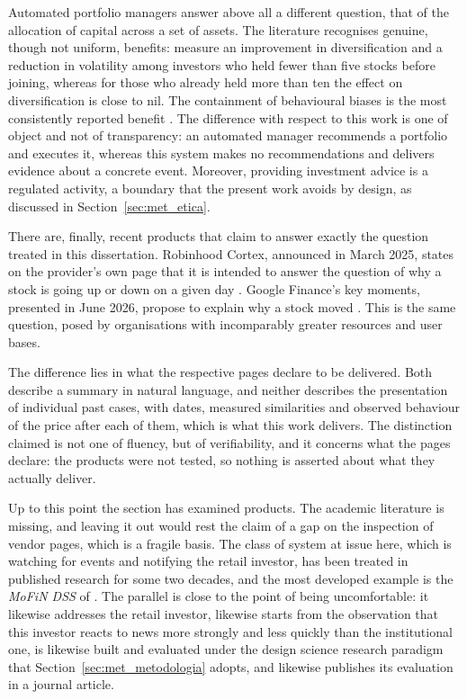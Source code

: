 Automated portfolio managers answer above all a different question, that of the allocation of
capital across a set of assets. The literature recognises genuine, though not uniform, benefits:
\textcite{dacunto2019robo} measure an improvement in diversification and a reduction in volatility
among investors who held fewer than five stocks before joining, whereas for those who already held
more than ten the effect on diversification is close to nil. The containment of behavioural biases
is the most consistently reported benefit \autocite{dacunto2019robo, cardillo2024robo}. The
difference with respect to this work is one of object and not of transparency: an automated manager
recommends a portfolio and executes it, whereas this system makes no recommendations and delivers
evidence about a concrete event. Moreover, providing investment advice is a regulated activity, a
boundary that the present work avoids by design, as discussed in Section~\ref{sec:met_etica}.

There are, finally, recent products that claim to answer exactly the question treated in this
dissertation. Robinhood Cortex, announced in March 2025, states on the provider's own page that it
is intended to answer the question of why a stock is going up or down on a given day
\autocite{robinhood2025cortex}. Google Finance's key moments, presented in June 2026, propose to
explain why a stock moved \autocite{google2026finance}. This is the same question, posed by
organisations with incomparably greater resources and user bases.

The difference lies in what the respective pages declare to be delivered. Both describe a summary
in natural language, and neither describes the presentation of individual past cases, with dates,
measured similarities and observed behaviour of the price after each of them, which is what this
work delivers. The distinction claimed is not one of fluency, but of verifiability, and it concerns
what the pages declare: the products were not tested, so nothing is asserted about what they
actually deliver.

Up to this point the section has examined products. The academic literature is missing, and leaving
it out would rest the claim of a gap on the inspection of vendor pages, which is a fragile basis.
The class of system at issue here, which is watching for events and notifying the retail investor, has
been treated in published research for some two decades, and the most developed example is the
\emph{MoFiN DSS} of \textcite{muntermann2009ubiquitous}. The parallel is close to the point of
being uncomfortable: it likewise addresses the retail investor, likewise starts from the
observation that this investor reacts to news more strongly and less quickly than the institutional
one, is likewise built and evaluated under the design science research paradigm that
Section~\ref{sec:met_metodologia} adopts, and likewise publishes its evaluation in a journal
article.

